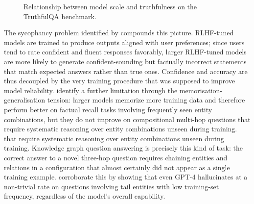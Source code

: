 \begin{figure}[H]
    \caption{Relationship between model scale and truthfulness on the TruthfulQA benchmark.}
    \label{fig:scaling}
\end{figure}

The sycophancy problem identified by \citet{perez2022sycophancy} compounds this picture. RLHF-tuned models are trained to produce outputs aligned with user preferences; since users tend to rate confident and fluent responses favorably, larger RLHF-tuned models are more likely to generate confident-sounding but factually incorrect statements that match expected answers rather than true ones. Confidence and accuracy are thus decoupled by the very training procedure that was supposed to improve model reliability. \citet{kandpal2023large} identify a further limitation through the memorisation-generalisation tension: larger models memorize more training data and therefore perform better on factual recall tasks involving frequently seen entity combinations, but they do not improve on compositional multi-hop questions that require systematic reasoning over entity combinations unseen during training. that require systematic reasoning over entity combinations unseen during training. Knowledge graph question answering is precisely this kind of task: the correct answer to a novel three-hop question requires chaining entities and relations in a configuration that almost certainly did not appear as a single training example. \citet{mallen2023not} corroborate this by showing that even GPT-4 hallucinates at a non-trivial rate on questions involving tail entities with low training-set frequency, regardless of the model's overall capability.

